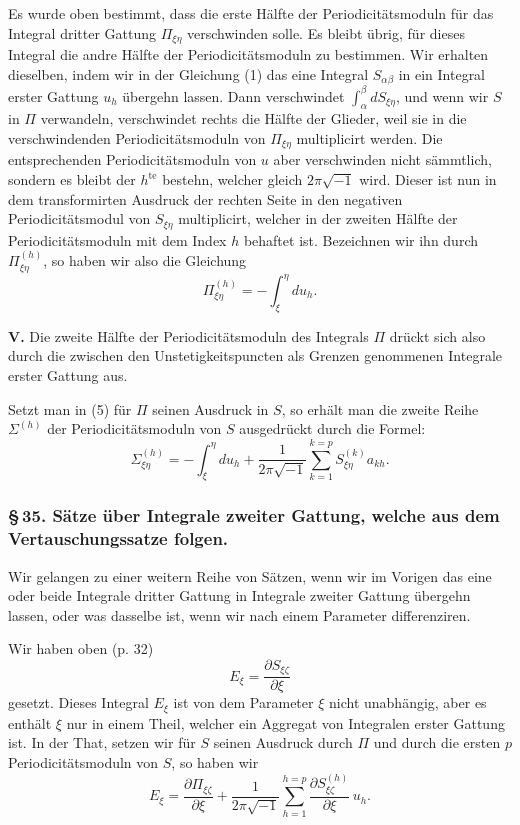 \documentclass[10pt]{article}
\begin{document}
Es wurde oben bestimmt, dass die erste Hälfte der Periodicitätsmoduln für das Integral dritter Gattung \(\Pi_{\xi\eta}\) verschwinden solle. Es bleibt übrig, für dieses Integral die andre Hälfte der Periodicitätsmoduln zu bestimmen. Wir erhalten dieselben, indem wir in der Gleichung (1) das eine Integral \(S_{\alpha\beta}\) in ein Integral erster Gattung \(u_h\) übergehn lassen. Dann verschwindet \(\int_{\alpha}^{\beta}dS_{\xi\eta}\), und wenn wir \(S\) in \(\Pi\) verwandeln, verschwindet rechts die Hälfte der Glieder, weil sie in die verschwindenden Periodicitätsmoduln von \(\Pi_{\xi\eta}\) multiplicirt werden. Die entsprechenden Periodicitätsmoduln von \(u\) aber verschwinden nicht sämmtlich, sondern es bleibt der \(h^{\mathrm{te}}\) bestehn, welcher gleich \(2\pi\sqrt{-1}\) wird. Dieser ist nun in dem transformirten Ausdruck der rechten Seite in den negativen Periodicitätsmodul von \(S_{\xi\eta}\) multiplicirt, welcher in der zweiten Hälfte der Periodicitätsmoduln mit dem Index \(h\) behaftet ist. Bezeichnen wir ihn durch \(\Pi_{\xi\eta}^{(h)}\), so haben wir also die Gleichung
\[
\tag{6}
\Pi_{\xi\eta}^{(h)}=-\int_{\xi}^{\eta}du_h.
\]

\noindent\textbf{V.} Die zweite Hälfte der Periodicitätsmoduln des Integrals \(\Pi\) drückt sich also durch die zwischen den Unstetigkeitspuncten als Grenzen genommenen Integrale erster Gattung aus.

Setzt man in (5) für \(\Pi\) seinen Ausdruck in \(S\), so erhält man die zweite Reihe \(\Sigma^{(h)}\) der Periodicitätsmoduln von \(S\) ausgedrückt durch die Formel:
\[
\tag{7}
\Sigma_{\xi\eta}^{(h)}=-\int_{\xi}^{\eta}du_h+\frac{1}{2\pi\sqrt{-1}}\sum_{k=1}^{k=p}S_{\xi\eta}^{(k)}a_{kh}.
\]

\subsubsection*{\S\,35. Sätze über Integrale zweiter Gattung, welche aus dem Vertauschungssatze folgen.}

Wir gelangen zu einer weitern Reihe von Sätzen, wenn wir im Vorigen das eine oder beide Integrale dritter Gattung in Integrale zweiter Gattung übergehn lassen, oder was dasselbe ist, wenn wir nach einem Parameter differenziren.

Wir haben oben (p. 32)
\[
E_\xi=\frac{\partial S_{\xi\zeta}}{\partial \xi}
\]
gesetzt. Dieses Integral \(E_\xi\) ist von dem Parameter \(\xi\) nicht unabhängig, aber es enthält \(\xi\) nur in einem Theil, welcher ein Aggregat von Integralen erster Gattung ist. In der That, setzen wir für \(S\) seinen Ausdruck durch \(\Pi\) und durch die ersten \(p\) Periodicitätsmoduln von \(S\), so haben wir
\[
\tag{8}
E_\xi=\frac{\partial \Pi_{\xi\zeta}}{\partial \xi}
+\frac{1}{2\pi\sqrt{-1}}\sum_{h=1}^{h=p}
\frac{\partial S_{\xi\zeta}^{(h)}}{\partial \xi}\,u_h.
\]
\end{document}
